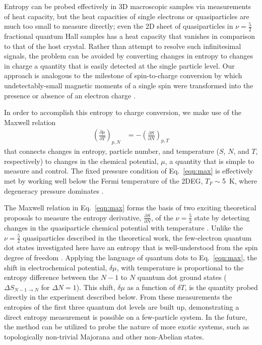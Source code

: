\documentclass[twocolumn,showpacs,preprintnumbers,amsmath,amssymb,pra,aps,superscriptaddress]{revtex4-1}
\begin{document}
Entropy can be probed effectively in 3D macroscopic samples via measurements of heat capacity, but the heat capacities of single electrons or quasiparticles are much too small to measure directly; even the 2D sheet of quasiparticles in $\nu = \frac{5}{2}$ fractional quantum Hall samples has a heat capacity that vanishes in comparison to that of the host crystal.  Rather than attempt to resolve such infinitesimal signals, the problem can be avoided by converting changes in entropy to changes in charge \textemdash a quantity that is easily detected at the single particle level.  Our approach is analogous to the milestone of spin-to-charge conversion by which undetectably-small magnetic moments of a single spin were transformed into the presence or absence of an electron charge \cite{Elzerman2004, Ono2004}.

In order to accomplish this entropy to charge conversion, we make use of the Maxwell relation
%
\begin{align}
\label{eqn:max}
        \left(\frac{\partial \mu}{\partial T}\right)_{p,N} &= -\left(\frac{\partial S}{\partial N}\right)_{p,T}
\end{align}
%
that connects changes in entropy, particle number, and temperature ($S$, $N$, and $T$, respectively) to changes in the chemical potential, $\mu$, a quantity that is simple to measure and control. The fixed pressure condition of Eq.~\ref{eqn:max} is effectively met by working well below the Fermi temperature of the 2DEG, $T_F \sim$\SI{5}{\kelvin}, where degeneracy pressure dominates \cite{Landau1969}.

The Maxwell relation in Eq.~\ref{eqn:max} forms the basis of two exciting theoretical proposals to measure the entropy derivative, $\frac{\partial S}{\partial N}$, of the $\nu = \frac{5}{2}$ state by detecting changes in the quasiparticle chemical potential with temperature \cite{Cooper2009,Ben-Shach2013}. Unlike the $\nu = \frac{5}{2}$ quasiparticles described in the theoretical work, the few-electron quantum dot states investigated here have an entropy that is well-understood from the spin degree of freedom \cite{Tarucha1996, Ciorga2000, Duncan2000, Lindemann2002, Potok2003, Hofmann2016}. Applying the language of quantum dots to Eq.~\ref{eqn:max}, the shift in electrochemical potential, $\delta \mu$, with temperature is proportional to the entropy difference between the $N-1$ to $N$ quantum dot ground states ($\Delta S_{N-1\rightarrow N}$ for $\Delta N=1$). This shift, $\delta \mu$ as a function of $\delta T$, is the quantity probed directly in the experiment described below. From these measurements the entropies of the first three quantum dot levels are built up, demonstrating a direct entropy measurement is possible on a few-particle system. In the future, the method can be utilized to probe the nature of more exotic systems, such as topologically non-trivial Majorana and other non-Abelian states. 
\end{document}
